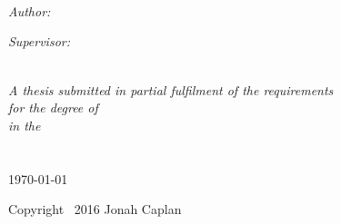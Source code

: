 \documentclass[
12pt, %
oneside, %
english, %
doublespacing, %
]{MastersDoctoralThesis} %
\begin{document}
\begin{titlepage}
\begin{center}
\begin{minipage}{0.2\textwidth}
\begin{flushright}
\end{flushright}
\end{minipage}
\vspace{1cm}

\HRule \\[0.4cm] %
{\huge \bfseries \ttitle}\\[0.4cm] %
\HRule \\[1.5cm] %
 
\begin{minipage}{0.4\textwidth}
\begin{flushleft} \large
\emph{Author:}\\
\authorname %
\end{flushleft}
\end{minipage}
\begin{minipage}{0.4\textwidth}
\begin{flushright} \large
\emph{Supervisor:} \\
\supname %
\end{flushright}
\end{minipage}\\[3cm]
 
\large \textit{A thesis submitted in partial fulfilment of the requirements\\ for the degree of \degreename}\\[0.3cm] %
\textit{in the}\\[0.4cm]
\groupname\\\deptname\\[1cm] %
 
{\large \today}\\[1cm] %
 
\vfill


Copyright \textsf{\textcopyright} \ 2016 Jonah Caplan

\end{center}

\end{titlepage}



\end{document}
